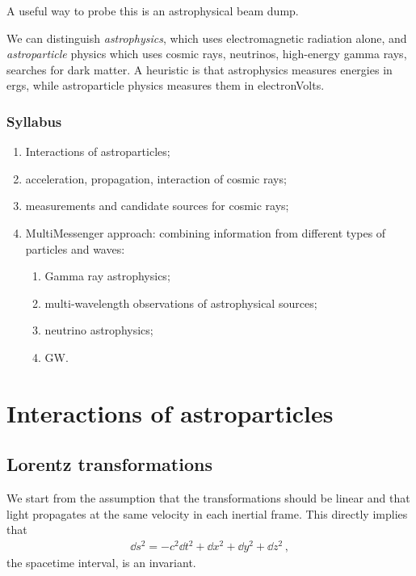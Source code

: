 \documentclass[main.tex]{subfiles}
\begin{document}
A useful way to probe this is an astrophysical beam dump. 

We can distinguish \emph{astrophysics}, which uses electromagnetic radiation alone, and \emph{astroparticle} physics which uses cosmic rays, neutrinos, high-energy gamma rays, searches for dark matter. 
A heuristic is that astrophysics measures energies in ergs, while astroparticle physics measures them in electronVolts. 

\subsection*{Syllabus}

\begin{enumerate}
  \item Interactions of astroparticles;
  \item acceleration, propagation, interaction of cosmic rays;
  \item measurements and candidate sources for cosmic rays;
  \item MultiMessenger approach: combining information from different types of particles and waves: 
  \begin{enumerate}
    \item Gamma  ray astrophysics;
    \item multi-wavelength observations of astrophysical sources;
    \item neutrino astrophysics;
    \item GW.
  \end{enumerate}
\end{enumerate}

\chapter{Interactions of astroparticles}

\section{Lorentz transformations}

We start from the assumption that the transformations should be linear and that light propagates at the same velocity in each inertial frame. This directly implies that 
%
\begin{align}
\dd{s^2} = - c^2 \dd{t^2} + \dd{x^2} + \dd{y^2} + \dd{z^2}
\,,
\end{align}
%
the spacetime interval, is an invariant.
\end{document}
